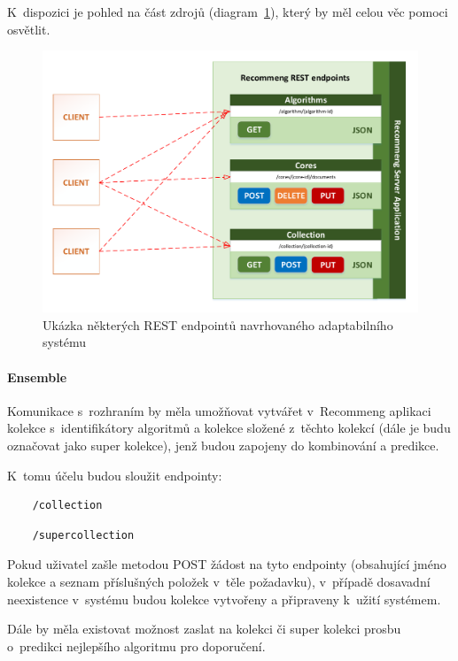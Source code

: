 \documentclass[thesis=M,czech]{FITthesis}[2014/05/07]
\begin{document}
K~dispozici je pohled na část zdrojů (diagram~\ref{fig:rest}), který by měl celou věc pomoci osvětlit. 

\begin{figure}\centering
	\includegraphics[width=1.0\textwidth]{obr/DIPLOMKA_rest.pdf}
 	\caption[Ukázka některých REST endpointů navrhovaného adaptabilního systému]{Ukázka některých REST endpointů navrhovaného adaptabilního systému}\label{fig:rest}
\end{figure}	

\paragraph{Ensemble}
Komunikace s~rozhraním by měla umožňovat vytvářet v~Recommeng aplikaci kolekce s~identifikátory algoritmů a kolekce složené z~těchto kolekcí (dále je budu označovat jako super kolekce), jenž budou zapojeny do kombinování a predikce. 

K~tomu účelu budou sloužit endpointy:

\begin{verbatim}
	/collection
\end{verbatim}

\begin{verbatim}
	/supercollection
\end{verbatim}

Pokud uživatel zašle metodou POST žádost na tyto endpointy (obsahující jméno kolekce a seznam příslušných položek v~těle požadavku), v~případě dosavadní neexistence v~systému budou kolekce vytvořeny a připraveny k~užití systémem.

Dále by měla existovat možnost zaslat na kolekci či super kolekci prosbu o~predikci nejlepšího algoritmu pro doporučení.
\end{document}
